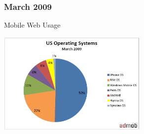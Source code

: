 \documentclass{beamer}
\begin{document}
\begin{frame}
 \frametitle{March 2009}

\begin{center}
\begin{large}
Mobile Web Usage
\end{large}

\hspace{0.2cm}
\includegraphics[height=5.0cm]{figs/mobile_web_usage0}
\hspace{0.2cm}
\end{center}

\end{frame}









\end{document}
